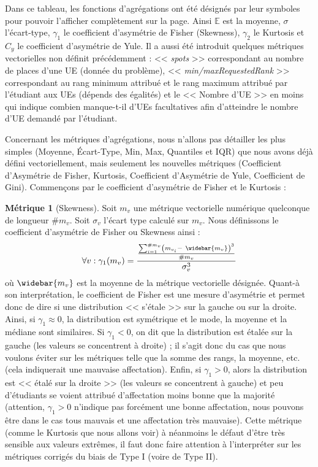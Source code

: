 \documentclass{rapport}
\theoremstyle{definition}
\theoremstyle{remark}
\theoremstyle{definition}
\newtheorem*{metric}{Métrique}
\theoremstyle{remark}
\begin{document}
Dans ce tableau, les fonctions d'agrégations ont été désignés par leur symboles pour pouvoir l'afficher complètement sur la page. Ainsi $\mathbb{E}$ est la moyenne, $\sigma$ l'écart-type, $\gamma_1$ le coefficient d'asymétrie de Fisher (Skewness), $\gamma_2$ le Kurtosis et $C_y$ le coefficient d'asymétrie de Yule.
Il a aussi été introduit quelques métriques vectorielles non définit précédemment : << \textit{spots} >> correspondant au nombre de places d'une UE (donnée du problème), << \textit{min/maxRequestedRank} >> correspondant au rang minimum attribué et le rang maximum attribué par l'étudiant aux UEs (dépends des égalités) et le << Nombre d'UE >> en moins qui indique combien manque-t-il d'UEs facultatives afin d'atteindre le nombre d'UE demandé par l'étudiant.

Concernant les métriques d'agrégations, nous n'allons pas détailler les plus simples (Moyenne, Écart-Type, Min, Max, Quantiles et IQR) que nous avons déjà défini vectoriellement, mais seulement les nouvelles métriques (Coefficient d'Asymétrie de Fisher, Kurtosis, Coefficient d'Asymétrie de Yule, Coefficient de Gini).
Commençons par le coefficient d'asymétrie de Fisher et le Kurtosis :
\begin{metric}[Skewness]
    Soit $m_v$ une métrique vectorielle numérique quelconque de longueur $\#m_v$. Soit $\sigma_v$ l'écart type calculé sur $m_v$. Nous définissons le coefficient d'asymétrie de Fisher ou Skewness ainsi :
    $$
        \forall v : \gamma_1 (m_v) = \frac{\frac{\sum_{i=1}^{\#m_v}\left(m_{v_i}-\ \widebar{m_v}\right)^3}{\#m_v}}{\sigma_v^3}
    $$
    où $\widebar{m_v}$ est la moyenne de la métrique vectorielle désignée. Quant-à son interprétation, le coefficient de Fisher est une mesure d'asymétrie et permet donc de dire si une distribution << s'étale >> sur la gauche ou sur la droite.
    Ainsi, si $\gamma_1\approx0$, la distribution est symétrique et le mode, la moyenne et la médiane sont similaires. Si $\gamma_1<0$, on dit que la distribution est étalée sur la gauche (les valeurs se concentrent à droite) ; il s'agit donc du cas que nous voulons éviter sur les métriques telle que la somme des rangs, la moyenne, etc. (cela indiquerait une mauvaise affectation).
    Enfin, si $\gamma_1>0$, alors la distribution est << étalé sur la droite >> (les valeurs se concentrent à gauche) et peu d'étudiants se voient attribué d'affectation moins bonne que la majorité (attention, $\gamma_1>0$ n'indique pas forcément une bonne affectation, nous pouvons être dans le cas tous mauvais et une affectation très mauvaise).
    Cette métrique (comme le Kurtosis que nous allons voir) à néanmoins le défaut d'être très sensible aux valeurs extrêmes, il faut donc faire attention à l'interpréter sur les métriques corrigés du biais de Type I (voire de Type II).
\end{metric}
\end{document}
